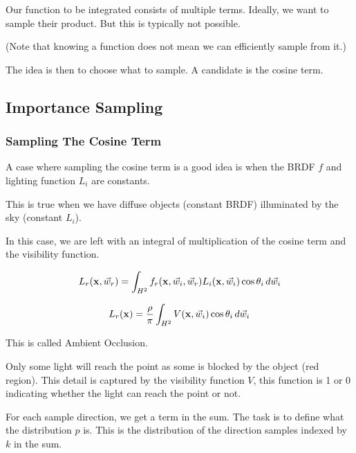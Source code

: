 \documentclass{article}
\begin{document}
Our function to be integrated consists of multiple terms. Ideally, we want to sample their product.
But this is typically not possible.

\vspace{5px}

(Note that knowing a function does not mean we can efficiently sample from it.)

\vspace{5px}

The idea is then to choose what to sample. A candidate is the cosine term.

\newpage

\subsection{Importance Sampling}

\subsubsection{Sampling The Cosine Term}

A case where sampling the cosine term is a good idea is when the BRDF \(f\) and lighting function \(L_i\) 
are constants.

\vspace{5px} 

This is true when we have diffuse objects (constant BRDF) illuminated by the sky (constant \(L_i\)).

\vspace{5px}

In this case, we are left with an integral of multiplication of the cosine term and the visibility function.

\[
    L_r(\text{\textbf{x}}, \vec{w}_r) = \int_{H^2} f_r(\text{\textbf{x}}, \vec{w}_i, \vec{w}_r)L_i(\text{\textbf{x}}, \vec{w}_i) \cos \theta_i \, d \vec{w}_i
\]

\[
    L_r(\text{\textbf{x}}) = \frac{\rho}{\pi} \int_{H^2} V(\text{\textbf{x}}, \vec{w}_i) \cos \theta_i \, d \vec{w}_i
\]

This is called Ambient Occlusion.

\vspace{10px}

Only some light will reach the point as some is blocked by the object (red region). This detail
is captured by the visibility function \(V\), this function is 1 or 0 indicating whether the 
light can reach the point or not.

\vspace{10px}

For each sample direction, we get a term in the sum. The task is to define what the distribution \(p\) is. This is the distribution of the
direction samples indexed by \(k\) in the sum.
\end{document}

